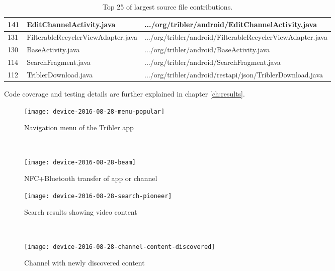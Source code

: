 \begin{table}
\begin{tabular}{l | l | l}
		141 &		EditChannelActivity.java &		.../org/tribler/android/EditChannelActivity.java \\ \hline
		131 &		FilterableRecyclerViewAdapter.java &		.../org/tribler/android/FilterableRecyclerViewAdapter.java \\ \hline
		130 & 		BaseActivity.java &		.../org/tribler/android/BaseActivity.java \\ \hline
		114 &		SearchFragment.java &		.../org/tribler/android/SearchFragment.java \\ \hline
		112 & 		TriblerDownload.java &		.../org/tribler/android/restapi/json/TriblerDownload.java \\ \hline
	\end{tabular}
	\caption{Top 25 of largest source file contributions.}
	\label{table:loc}
\end{table}

Code coverage and testing details are further explained in chapter \ref{ch:results}.




\begin{figure}
	\centering
\begin{minipage}{.4\textwidth}
	\texttt{[image: device-2016-08-28-menu-popular]}
	\caption{Navigation menu of the Tribler app}
	\label{fig:menu-popular}
\end{minipage}
~
\begin{minipage}{.4\textwidth}
	\texttt{[image: device-2016-08-28-beam]}
	\caption{NFC+Bluetooth transfer of app or channel}
	\label{fig:beam}
\end{minipage}

\begin{minipage}{.4\textwidth}
	\texttt{[image: device-2016-08-28-search-pioneer]}
	\caption{Search results showing video content}
	\label{fig:search-pioneer}
\end{minipage}
~
\begin{minipage}{.4\textwidth}
	\texttt{[image: device-2016-08-28-channel-content-discovered]}
	\caption{Channel with newly discovered content}
	\label{fig:channel-content-discovered}
\end{minipage}
\end{figure}